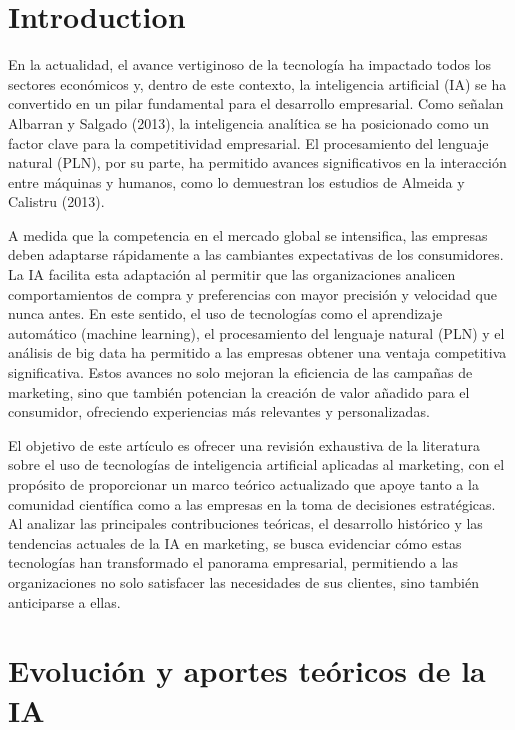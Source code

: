 \documentclass[9pt]{article}
\begin{document}
\newpage
\section*{Introduction}

En la actualidad, el avance vertiginoso de la tecnología ha impactado todos los sectores económicos y, dentro de este contexto, la inteligencia artificial (IA) se ha convertido en un pilar fundamental para el desarrollo empresarial. Como señalan Albarran y Salgado (2013), la inteligencia analítica se ha posicionado como un factor clave para la competitividad empresarial. El procesamiento del lenguaje natural (PLN), por su parte, ha permitido avances significativos en la interacción entre máquinas y humanos, como lo demuestran los estudios de Almeida y Calistru (2013).\cite{albarran2013inteligencia}

A medida que la competencia en el mercado global se intensifica, las empresas deben adaptarse rápidamente a las cambiantes expectativas de los consumidores. La IA facilita esta adaptación al permitir que las organizaciones analicen comportamientos de compra y preferencias con mayor precisión y velocidad que nunca antes. En este sentido, el uso de tecnologías como el aprendizaje automático (machine learning), el procesamiento del lenguaje natural (PLN) y el análisis de big data ha permitido a las empresas obtener una ventaja competitiva significativa. Estos avances no solo mejoran la eficiencia de las campañas de marketing, sino que también potencian la creación de valor añadido para el consumidor, ofreciendo experiencias más relevantes y personalizadas.

El objetivo de este artículo es ofrecer una revisión exhaustiva de la literatura sobre el uso de tecnologías de inteligencia artificial aplicadas al marketing, con el propósito de proporcionar un marco teórico actualizado que apoye tanto a la comunidad científica como a las empresas en la toma de decisiones estratégicas. Al analizar las principales contribuciones teóricas, el desarrollo histórico y las tendencias actuales de la IA en marketing, se busca evidenciar cómo estas tecnologías han transformado el panorama empresarial, permitiendo a las organizaciones no solo satisfacer las necesidades de sus clientes, sino también anticiparse a ellas. 

\section*{Evolución y aportes teóricos de la IA}
\end{document}

